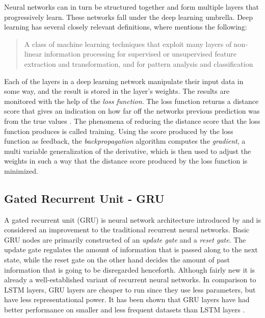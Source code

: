 \documentclass[nofilelist]{cslthse-msc}
\begin{document}
Neural networks can in turn be structured together and form multiple layers that progressively learn. These networks fall under the deep learning umbrella. Deep learning has several closely relevant definitions, where \citet{deng2014deep} mentions the following:

\begin{quote}{A class of machine learning techniques that exploit many layers of non-linear information processing for supervised or unsupervised feature extraction and transformation, and for pattern analysis and classification}
\end{quote}

Each of the layers in a deep learning network manipulate their input data in some way, and the result is stored in the layer's weights. The results are monitored with the help of the \textit{loss function}. The loss function returns a distance score that gives an indication on how far off the networks previous prediction was from the true values \citep{franoischollet2017learning}. The phenomena of reducing the distance score that the loss function produces is called training. 
Using the score produced by the loss function as feedback, the \textit{backpropagation} algorithm computes the \textit{gradient}, a multi variable generalization of the derivative, which is then used to adjust the weights in such a way that the distance score produced by the loss function is minimized. 






\subsection{Gated Recurrent Unit - GRU}
A gated recurrent unit (GRU) is neural network architecture introduced by \citet{cho2014learning} and is considered an improvement to the traditional recurrent neural networks. Basic GRU nodes are primarily constructed of an \textit{update gate} and a \textit{reset gate}. The update gate regulates the amount of information that is passed along to the next state, while the reset gate on the other hand decides the amount of past information that is going to be disregarded henceforth. 
Although fairly new it is already a well-established variant of recurrent neural networks. In comparison to LSTM layers, GRU layers are cheaper to run since they use less parameters, but have less representational power. It has been shown that GRU layers have had better performance on smaller and less frequent datasets than LSTM layers \citep{Gruber2020AreGC}.
\end{document}
